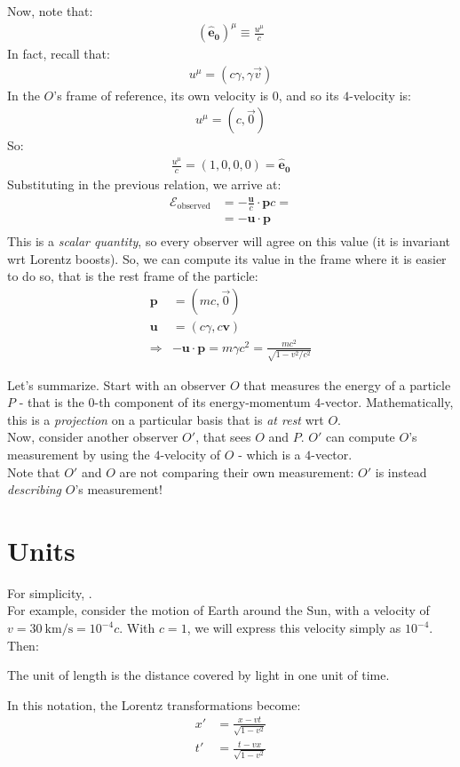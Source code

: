\documentclass[../template.tex]{subfiles}
\begin{document}
Now, note that:
\begin{align*}
    (\bm{\hat{e}_0})^\mu \equiv \frac{u^\mu}{c} 
\end{align*}
In fact, recall that:
\begin{align*}
    u^\mu = (c \gamma, \gamma \vec{v})
\end{align*}
In the $O$'s frame of reference, its own velocity is $0$, and so its $4$-velocity is:
\begin{align*}
    u^\mu = (c, \vec{0})
\end{align*}
So:
\begin{align*}
    \frac{u^\mu}{c} = (1,0,0,0) = \bm{\hat{e}_0} 
\end{align*}
Substituting in the previous relation, we arrive at:
\begin{align*}
    \mathcal{E}_{\mathrm{observed} } &= -\frac{\bm{u}}{c} \cdot \bm{p} c =  \\
    &= - \bm{u} \cdot \bm{p} \\
\end{align*}
This is a \textit{scalar quantity}, so every observer will agree on this value (it is invariant wrt Lorentz boosts). So, we can compute its value in the frame where it is easier to do so, that is the rest frame of the particle:
\begin{align*}
    \bm{p} &= (mc, \vec{0})\\
    \bm{u} &= (c \gamma, c \bm{v}) \\
    \Rightarrow & - \bm{u} \cdot \bm{p} = m \gamma c^2 = \frac{m c^2}{\sqrt{1- v^2/c^2}} 
\end{align*} 

Let's summarize. Start with an observer $O$  that measures the energy of a particle $P$ - that is the $0$-th component of its energy-momentum $4$-vector. Mathematically, this is a \textit{projection} on a particular basis that is \textit{at rest} wrt $O$.\\
Now, consider another observer $O'$, that sees $O$ and $P$. $O'$ can compute $O$'s measurement by using the $4$-velocity of $O$ - which is a $4$-vector.\\
Note that $O'$ and $O$ are not comparing their own measurement: $O'$ is instead \textit{describing} $O$'s measurement!

\section{Units}
For simplicity, .\\
For example, consider the motion of Earth around the Sun, with a velocity of $v=\SI{30}{\kilo\m\per\s} = 10^{-4}c$. With $c = 1$, we will express this velocity simply as $10^{-4}$.\\
Then:
\begin{center}
    The unit of length is the distance covered by light in one unit of time.
\end{center}
In this notation, the Lorentz transformations become:
\begin{align*}
    x' &= \frac{x-vt}{\sqrt{1-v^2}}  \\
    t' &= \frac{t-vx}{\sqrt{1-v^2}} 
\end{align*}
\end{document}
